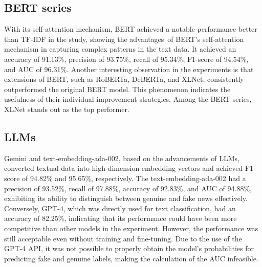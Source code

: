 \subsection{BERT series}
With its self-attention mechanism, BERT achieved a notable performance better than TF-IDF in the study, showing the advantages of BERT's self-attention mechanism in capturing complex patterns in the text data. It achieved an accuracy of 91.13\%, precision of 93.75\%, recall of 95.34\%, F1-score of 94.54\%, and AUC of 96.31\%. Another interesting observation in the experiments is that extensions of BERT, such as RoBERTa, DeBERTa, and XLNet, consistently outperformed the original BERT model. This phenomenon indicates the usefulness of their individual improvement strategies. Among the BERT series, XLNet stands out as the top performer.
\subsection{LLMs}
Gemini and text-embedding-ada-002, based on the advancements of LLMs, converted textual data into high-dimension embedding vectors and achieved F1-score of 94.82\% and 95.65\%, respectively. The text-embedding-ada-002 had a precision of 93.52\%, recall of 97.88\%, accuracy of 92.83\%, and AUC of 94.88\%, exhibiting its ability to distinguish between genuine and fake news effectively. Conversely, GPT-4, which was directly used for text classification, had an accuracy of 82.25\%, indicating that its performance could have been more competitive than other models in the experiment. However, the performance was still acceptable even without training and fine-tuning. Due to the use of the GPT-4 API, it was not possible to properly obtain the model's probabilities for predicting fake and genuine labels, making the calculation of the AUC infeasible.
